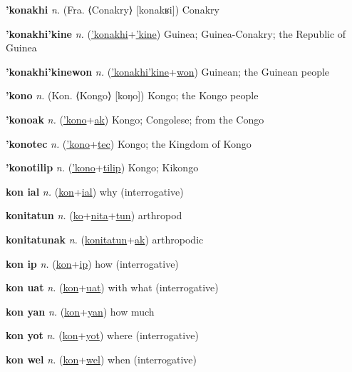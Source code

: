 \textbf{\hypertarget{'konakhi}{'konakhi}} \textit{n.} (Fra. ⟨Conakry⟩ [konakʁi])
Conakry

\textbf{\hypertarget{'konakhi'kine}{'konakhi'kine}} \textit{n.} (\hyperlink{'konakhi}{'konakhi}+\allowbreak \hyperlink{'kine}{'kine})
Guinea; Guinea-Conakry; the Republic of Guinea

\textbf{\hypertarget{'konakhi'kinewon}{'konakhi'kinewon}} \textit{n.} (\hyperlink{'konakhi'kine}{'konakhi'kine}+\allowbreak \hyperlink{won}{won})
Guinean; the Guinean people

\textbf{\hypertarget{'kono}{'kono}} \textit{n.} (Kon. ⟨Kongo⟩ [koŋo])
Kongo; the Kongo people

\textbf{\hypertarget{'konoak}{'konoak}} \textit{n.} (\hyperlink{'kono}{'kono}+\allowbreak \hyperlink{ak}{ak})
Kongo; Congolese; from the Congo

\textbf{\hypertarget{'konotec}{'konotec}} \textit{n.} (\hyperlink{'kono}{'kono}+\allowbreak \hyperlink{tec}{tec})
Kongo; the Kingdom of Kongo

\textbf{\hypertarget{'konotilip}{'konotilip}} \textit{n.} (\hyperlink{'kono}{'kono}+\allowbreak \hyperlink{tilip}{tilip})
Kongo; Kikongo

\textbf{\hypertarget{kon ial}{kon ial}} \textit{n.} (\hyperlink{kon}{kon}+\allowbreak \hyperlink{ial}{ial})
why (interrogative)

\textbf{\hypertarget{konitatun}{konitatun}} \textit{n.} (\hyperlink{ko}{ko}+\allowbreak \hyperlink{nita}{nita}+\allowbreak \hyperlink{tun}{tun})
arthropod

\textbf{\hypertarget{konitatunak}{konitatunak}} \textit{n.} (\hyperlink{konitatun}{konitatun}+\allowbreak \hyperlink{ak}{ak})
arthropodic

\textbf{\hypertarget{kon ip}{kon ip}} \textit{n.} (\hyperlink{kon}{kon}+\allowbreak \hyperlink{ip}{ip})
how (interrogative)

\textbf{\hypertarget{kon uat}{kon uat}} \textit{n.} (\hyperlink{kon}{kon}+\allowbreak \hyperlink{uat}{uat})
with what (interrogative)

\textbf{\hypertarget{kon yan}{kon yan}} \textit{n.} (\hyperlink{kon}{kon}+\allowbreak \hyperlink{yan}{yan})
how much

\textbf{\hypertarget{kon yot}{kon yot}} \textit{n.} (\hyperlink{kon}{kon}+\allowbreak \hyperlink{yot}{yot})
where (interrogative)

\textbf{\hypertarget{kon wel}{kon wel}} \textit{n.} (\hyperlink{kon}{kon}+\allowbreak \hyperlink{wel}{wel})
when (interrogative)

